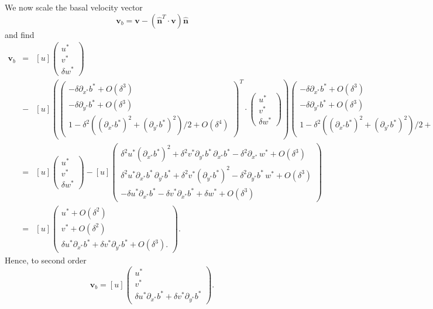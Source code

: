 \documentclass[10pt,a4paper]{book}
\newcommand{\p}{\partial}
\newcommand{\de}{\delta}
\newcommand{\normal}{\hat{\bm{n}}}
\begin{document}
We now scale the basal velocity vector
\[
\bm{v}_b=\bm{v}-(\normal^T \cdot \bm{v}) \normal 
\]
and find 
\begin{eqnarray*}
\bm{v}_b&=&[u] \left (\begin{array}{c} 
            u^* \\ v^* \\ \de w^* 
        \end{array} \right ) \\
&-&
[u] \left ( \left ( \begin{array}{c} -\de \p_{x^*} b^* +O(\de^3) \\ 
          -\de \p_{y^*} b^* +O(\de^3) \\ 
         1 -\de^2 ((\p_{x^*} b^*)^2+(\p_{y^*} b^*)^2)/2 +O(\de^4)
 \end{array} \right )^T \cdot  \left (\begin{array}{c} 
            u^* \\ v^* \\ \de w^* 
        \end{array} \right ) \right )
\left ( \begin{array}{c} -\de \p_{x^*} b^* +O(\de^3) \\ 
          -\de \p_{y^*} b^* +O(\de^3) \\ 
         1 -\de^2 ((\p_{x^*} b^*)^2+(\p_{y^*} b^*)^2)/2 +O(\de^4)
 \end{array} \right ) \\
&=& [u] \left (\begin{array}{c} 
            u^* \\ v^* \\ \de w^* 
        \end{array} \right ) 
- [u] \left ( \begin{array}{c}
\de^2 u^* (\p_{x^*} b^*)^2+\de^2 v^* \p_{y^*} b^* \,\p_{x^*} b^* - \de^2 \p_{x^*} \, w^* +O(\de^3)\\
 \de^2 u^* \p_{x^*} b^* \,\p_{y^*} b^*+\de^2 v^* (\p_{y^*} b^*)^2 - \de^2 \p_{y^*} b^*\, w^* +O(\de^3)\\
-\de u^* \p_{x^*} b^* - \de v^* \p_{x^*} b^* + \de w^* + O(\de^3) 
        \end{array} \right )\\
&=& [u] \left ( \begin{array}{c}
 u^*+O(\de^2) \\
 v^*+O(\de^2)\\
 \de u^* \p_{x^*} b^* +\de v^* \p_{y^*} b^* +O(\de^3).
        \end{array} \right ) .
\end{eqnarray*}
Hence, to second order
\[
\bm{v}_b=[u] \left (\begin{array}{c} 
            u^* \\ v^* \\  \de u^* \p_{x^*} b^* +\de v^* \p_{y^*} b^* 
        \end{array} \right ) .
\]
\end{document}
